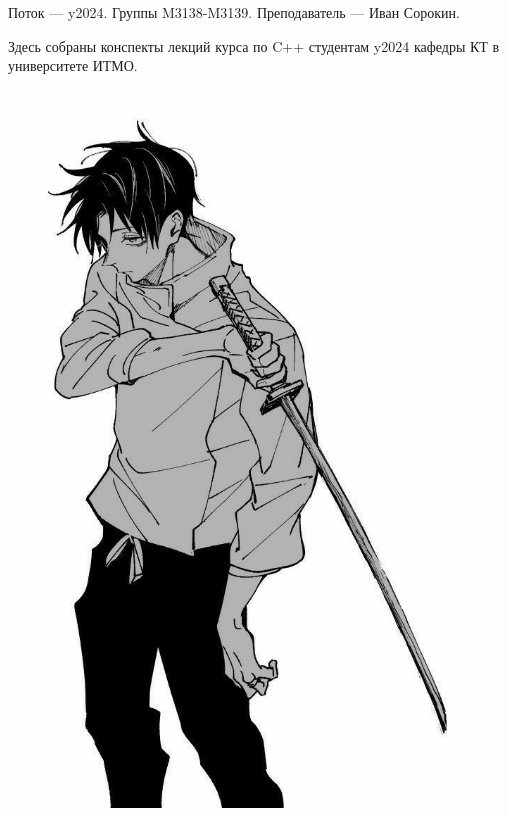 Поток — y2024.\newline
Группы M3138-M3139.\newline
Преподаватель --- Иван Сорокин.\par

Здесь собраны конспекты лекций курса по C++ студентам y2024 кафедры КТ в университете ИТМО.

\begin{center}
   \includegraphics[height=19cm]{assets/youta.jpg}
\end{center}